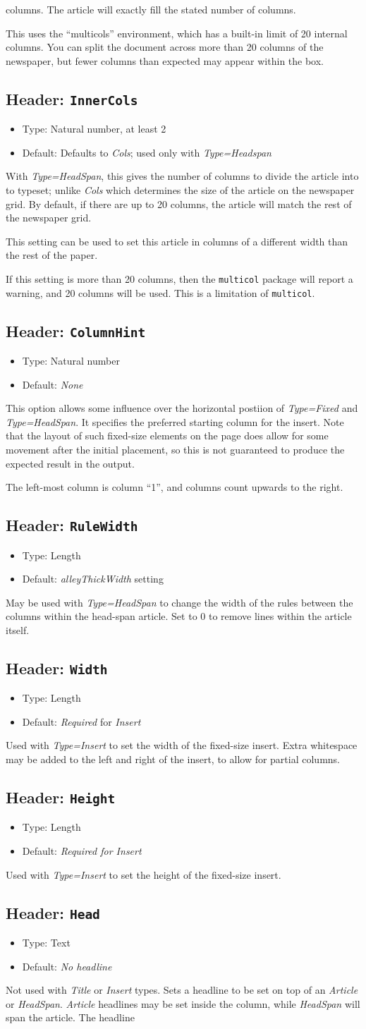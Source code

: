 \documentclass[a4paper,DIV=11]{scrartcl}
\newcommand{\property}[5]{
  \subsection{#1: \texttt{#2}}
  \begin{itemize}
  \item Type: #3
  \item Default: #4
  \end{itemize}
  #5
}
\newcommand{\header}{\property{Header}}
\begin{document}
\begin{multicols}{2}
{  columns. The article will exactly fill the stated number of
  columns.\par
  This uses the ``multicols'' environment, which has
  a built-in limit of 20 internal columns. You can split the document
  across more than 20 columns of the newspaper, but fewer columns than
  expected may appear within the box.
}
\header{InnerCols}{Natural number, at least 2}{Defaults to \textit{Cols}; used only with \textit{Type=Headspan}}{
  With \textit{Type=HeadSpan}, this gives the number of columns to
  divide the article into to typeset; unlike \textit{Cols} which
  determines the size of the article on the newspaper grid. By
  default, if there are up to 20 columns, the article will match the
  rest of the newspaper grid.\par
  This setting can be used to set this article in columns of a
  different width than the rest of the paper.\par
  If this setting is more than 20 columns, then the \texttt{multicol}
  package will report a warning, and 20 columns will be used. This is
  a limitation of \texttt{multicol}.
}
\header{ColumnHint}{Natural number}{\textit{None}}{
  This option allows some influence over the horizontal postiion of
  \textit{Type=Fixed} and \textit{Type=HeadSpan}. It specifies the
  preferred starting column for the insert. Note that the layout of
  such fixed-size elements on the page does allow for some movement
  after the initial placement, so this is not guaranteed to produce
  the expected result in the output.\par
  The left-most column is column ``1'', and columns count upwards to
  the right.
}
\header{RuleWidth}{Length}{\textit{alleyThickWidth} setting}{
  May be used with \textit{Type=HeadSpan} to change the width of the
  rules between the columns within the head-span article. Set to 0 to
  remove lines within the article itself.
}
\header{Width}{Length}{\textit{Required} for \textit{Insert}}{
  Used with \textit{Type=Insert} to set the width of the fixed-size
  insert. Extra whitespace may be added to the left and right of the
  insert, to allow for partial columns.
}
\header{Height}{Length}{\textit{Required for \textit{Insert}}}{
  Used with \textit{Type=Insert} to set the height of the fixed-size
  insert.
}
\header{Head}{Text}{\textit{No headline}}{
  Not used with \textit{Title} or \textit{Insert} types.
  Sets a headline to be set on top of an \textit{Article} or
  \textit{HeadSpan}. \textit{Article} headlines may be set inside the
  column, while \textit{HeadSpan} will span the article. The headline
}
\end{multicols}
\end{document}

